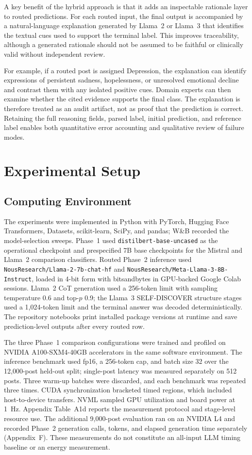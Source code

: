 \documentclass{ieeeaccess}
\begin{document}
A key benefit of the hybrid approach is that it adds an inspectable rationale layer to routed predictions. For each routed input, the final output is accompanied by a natural-language explanation generated by Llama~2 or Llama~3 that identifies the textual cues used to support the terminal label. This improves traceability, although a generated rationale should not be assumed to be faithful or clinically valid without independent review.

For example, if a routed post is assigned Depression, the explanation can identify expressions of persistent sadness, hopelessness, or unresolved emotional decline and contrast them with any isolated positive cues. Domain experts can then examine whether the cited evidence supports the final class. The explanation is therefore treated as an audit artifact, not as proof that the prediction is correct. Retaining the full reasoning fields, parsed label, initial prediction, and reference label enables both quantitative error accounting and qualitative review of failure modes.

\section{Experimental Setup}

\subsection{Computing Environment}

The experiments were implemented in Python with PyTorch, Hugging Face Transformers, Datasets, scikit-learn, SciPy, and pandas; W\&B recorded the model-selection sweeps. Phase~1 used \texttt{distilbert-base-uncased} as the operational checkpoint and prespecified 7B base checkpoints for the Mistral and Llama~2 comparison classifiers. Routed Phase~2 inference used \texttt{NousResearch/Llama-2-7b-chat-hf} and \texttt{NousResearch/Meta-Llama-3-8B-Instruct}, loaded in 4-bit form with bitsandbytes in GPU-backed Google Colab sessions. Llama~2 CoT generation used a 256-token limit with sampling temperature 0.6 and top-$p$ 0.9; the Llama~3 SELF-DISCOVER structure stages used a 1,024-token limit and the terminal answer was decoded deterministically. The repository notebooks print installed package versions at runtime and save prediction-level outputs after every routed row.

The three Phase~1 comparison configurations were trained and profiled on NVIDIA A100-SXM4-40GB accelerators in the same software environment. The inference benchmark used fp16, a 256-token cap, and batch size 32 over the 12,000-post held-out split; single-post latency was measured separately on 512 posts. Three warm-up batches were discarded, and each benchmark was repeated three times. CUDA synchronization bracketed timed regions, which included host-to-device transfers. NVML sampled GPU utilization and board power at 1~Hz. Appendix Table~A1d reports the measurement protocol and stage-level resource use. The additional 9,000-post evaluation ran on an NVIDIA L4 and recorded Phase~2 generation calls, tokens, and elapsed generation time separately (Appendix~F). These measurements do not constitute an all-input LLM timing baseline or an energy measurement.
\end{document}
